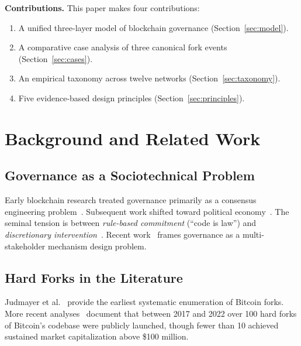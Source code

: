 \documentclass[sigconf,nonacm]{acmart}
\begin{document}
\textbf{Contributions.} This paper makes four contributions:
\begin{enumerate}
  \item A unified three-layer model of blockchain governance (Section~\ref{sec:model}).
  \item A comparative case analysis of three canonical fork events (Section~\ref{sec:cases}).
  \item An empirical taxonomy across twelve networks (Section~\ref{sec:taxonomy}).
  \item Five evidence-based design principles (Section~\ref{sec:principles}).
\end{enumerate}

\section{Background and Related Work}

\subsection{Governance as a Sociotechnical Problem}

Early blockchain research treated governance primarily as a consensus engineering
problem~\cite{nakamoto2008bitcoin,buterin2014ethereum}. Subsequent work shifted toward
political economy~\cite{wright2015decentralized,reijers2021governance}. The seminal
tension is between \emph{rule-based commitment} (``code is law'') and
\emph{discretionary intervention}~\cite{walch2019code,de2021blockchain}. Recent
work~\cite{lumineau2021blockchain,el-amine2022} frames governance as a multi-stakeholder
mechanism design problem.

\subsection{Hard Forks in the Literature}

Judmayer et al.~\cite{judmayer2017merged} provide the earliest systematic enumeration of
Bitcoin forks. More recent analyses~\cite{eskandari2021sok,liu2021fork} document that
between 2017 and 2022 over 100 hard forks of Bitcoin's codebase were publicly launched,
though fewer than 10 achieved sustained market capitalization above \$100 million.

\end{document}
